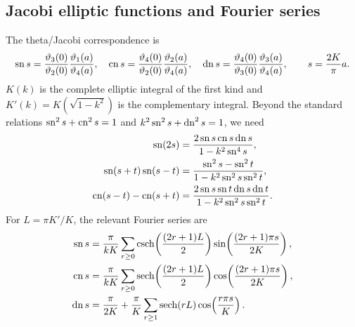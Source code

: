 \subsection{Jacobi elliptic functions and Fourier series}
The theta/Jacobi correspondence is
\begin{equation}
  \operatorname{sn} s=\frac{\vartheta_3(0)}{\vartheta_2(0)}
  \frac{\vartheta_1(a)}{\vartheta_4(a)},\quad
  \operatorname{cn} s=\frac{\vartheta_4(0)}{\vartheta_2(0)}
  \frac{\vartheta_2(a)}{\vartheta_4(a)},\quad
  \operatorname{dn} s=\frac{\vartheta_4(0)}{\vartheta_3(0)}
  \frac{\vartheta_3(a)}{\vartheta_4(a)},\qquad s=\frac{2K}{\pi}a.
\end{equation}
$K(k)$ is the complete elliptic integral of the first kind and
$K'(k)=K(\sqrt{1-k^2})$ is the complementary integral. Beyond the standard
relations $\operatorname{sn}^2s+\operatorname{cn}^2s=1$ and $k^2\operatorname{sn}^2s+\operatorname{dn}^2s=1$, we need
\begin{equation}
  \begin{aligned}
    \operatorname{sn}(2s)&=\frac{2\operatorname{sn} s\operatorname{cn} s\operatorname{dn} s}{1-k^2\operatorname{sn}^4s},\\
    \operatorname{sn}(s+t)\operatorname{sn}(s-t)&=
    \frac{\operatorname{sn}^2s-\operatorname{sn}^2t}{1-k^2\operatorname{sn}^2s\operatorname{sn}^2t},\\
    \operatorname{cn}(s-t)-\operatorname{cn}(s+t)&=
    \frac{2\operatorname{sn} s\operatorname{sn} t\operatorname{dn} s\operatorname{dn} t}{1-k^2\operatorname{sn}^2s\operatorname{sn}^2t}.
  \end{aligned}
\end{equation}
For $L=\pi K'/K$, the relevant Fourier series are
\begin{align}
  \operatorname{sn} s&=\frac\pi{kK}\sum_{r\geq0}
  \operatorname{csch}\!\left(\frac{(2r+1)L}{2}\right)
  \sin\!\left(\frac{(2r+1)\pi s}{2K}\right),\label{eq:sn-fourier}\\
  \operatorname{cn} s&=\frac\pi{kK}\sum_{r\geq0}
  \operatorname{sech}\!\left(\frac{(2r+1)L}{2}\right)
  \cos\!\left(\frac{(2r+1)\pi s}{2K}\right),\label{eq:cn-fourier}\\
  \operatorname{dn} s&=\frac\pi{2K}+\frac\pi K\sum_{r\geq1}
  \operatorname{sech}(rL)\cos\!\left(\frac{r\pi s}{K}\right).
  \label{eq:dn-fourier}
\end{align}

